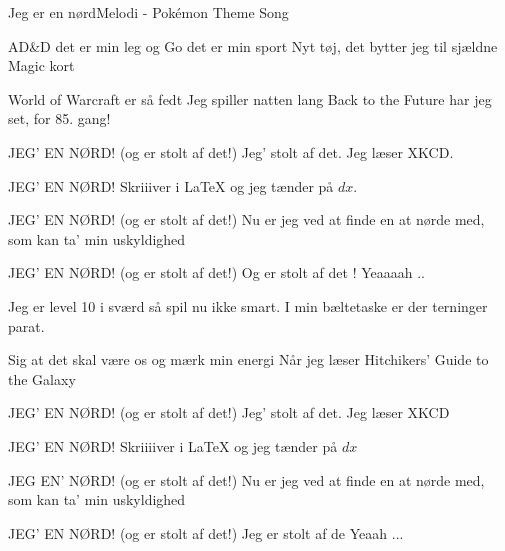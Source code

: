 \begin{sang}{Jeg er en nørd}{Melodi - Pokémon Theme Song}
\begin{vers}
AD\&D det er min leg
og Go det er min sport
Nyt tøj, det bytter jeg
til sjældne Magic kort
\end{vers}
\begin{vers}
World of Warcraft er så fedt
Jeg spiller natten lang
Back to the Future har jeg set,
for 85. gang!
\end{vers}
\begin{vers}
JEG' EN NØRD!
 (og er stolt af det!)
Jeg' stolt af det.
Jeg læser XKCD.
\end{vers}
\begin{vers}
JEG' EN NØRD!
Skriiiver i \LaTeX{}
og jeg tænder på $dx$.
\end{vers}
\begin{vers}
JEG' EN NØRD!
 (og er stolt af det!)
Nu er jeg ved
at finde en at nørde med,
som kan ta' min uskyldighed
\end{vers}
\begin{vers}
JEG' EN NØRD!
 (og er stolt af det!)
Og er stolt af det !
Yeaaaah ..
\end{vers}
\vbox{}\vfill
\begin{vers}
Jeg er level 10 i sværd
så spil nu ikke smart.
I min bæltetaske er 
der terninger parat.
\end{vers}
\begin{vers}
Sig at det skal være os
og mærk min energi
Når jeg læser Hitchikers'
Guide to the Galaxy
\end{vers}
\begin{vers}
JEG' EN NØRD!
 (og er stolt af det!)
Jeg' stolt af det.
Jeg læser XKCD
\end{vers}
\begin{vers}
JEG' EN NØRD!
Skriiiiver i \LaTeX{}
og jeg tænder på $dx$
\end{vers}
\begin{vers}
JEG EN' NØRD!
 (og er stolt af det!)
Nu er jeg ved
at finde en at nørde med,
som kan ta' min uskyldighed
\end{vers}
\begin{vers}
JEG' EN NØRD!
 (og er stolt af det!)
Jeg er stolt af de
Yeaah ...
\end{vers}
\laps
\end{sang}

